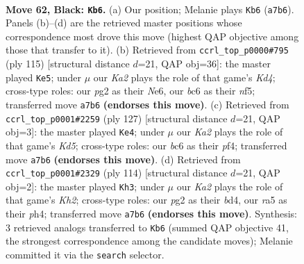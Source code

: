 \documentclass[11pt]{article}
\begin{document}
\clearpage

\begin{figure}[p]\centering
\begin{subfigure}{0.46\textwidth}\centering
\resizebox{\linewidth}{!}{%
\newchessgame
\chessboard[
  setfen={8/k7/2B1r3/R7/1P3p2/6N1/6P1/1K6 b - - 1 62},
  showmover=false,
  pgfstyle=straightmove, color=movearrow, markmove={a7-b6}
]}
\caption{}
\end{subfigure}\hfill
\begin{subfigure}{0.46\textwidth}\centering
\resizebox{\linewidth}{!}{%
\newchessgame
\chessboard[
  setfen={8/5r2/K3n3/3k1NPp/8/7P/8/3R4 b - - 2 58},
  showmover=false,
  pgfstyle=straightmove, color=movearrow, markmove={d5-e5}
]}
\caption{}
\end{subfigure}
\\[4pt]
\begin{subfigure}{0.46\textwidth}\centering
\resizebox{\linewidth}{!}{%
\newchessgame
\chessboard[
  setfen={8/8/6p1/8/1K1k1P1r/6R1/5P2/8 b - - 3 64},
  showmover=false,
  pgfstyle=straightmove, color=movearrow, markmove={d4-e4}
]}
\caption{}
\end{subfigure}\hfill
\begin{subfigure}{0.46\textwidth}\centering
\resizebox{\linewidth}{!}{%
\newchessgame
\chessboard[
  setfen={8/8/1n1R4/1P2p1k1/3b3p/8/2B4K/8 w - - 8 58},
  showmover=false,
  pgfstyle=straightmove, color=movearrow, markmove={h2-h3}
]}
\caption{}
\end{subfigure}
\caption{\textbf{Move 62, Black: \texttt{Kb6}.} (a) Our position; Melanie plays \texttt{Kb6} (\texttt{a7b6}). Panels (b)--(d) are the retrieved master positions whose correspondence most drove this move (highest QAP objective among those that transfer to it). (b) Retrieved from \texttt{ccrl\_top\_p0000\#795} (ply 115) [structural distance $d$=21, QAP obj=36]: the master played \texttt{Ke5}; under $\mu$ our \emph{Ka2} plays the role of that game's \emph{Kd4}; cross-type roles: our \emph{p}g2 as their \emph{N}e6, our \emph{b}c6 as their \emph{n}f5; transferred move \texttt{a7b6} \textbf{(endorses this move)}. (c) Retrieved from \texttt{ccrl\_top\_p0001\#2259} (ply 127) [structural distance $d$=21, QAP obj=3]: the master played \texttt{Ke4}; under $\mu$ our \emph{Ka2} plays the role of that game's \emph{Kd5}; cross-type roles: our \emph{b}c6 as their \emph{p}f4; transferred move \texttt{a7b6} \textbf{(endorses this move)}. (d) Retrieved from \texttt{ccrl\_top\_p0001\#2329} (ply 114) [structural distance $d$=21, QAP obj=2]: the master played \texttt{Kh3}; under $\mu$ our \emph{Ka2} plays the role of that game's \emph{Kh2}; cross-type roles: our \emph{p}g2 as their \emph{b}d4, our \emph{r}a5 as their \emph{p}h4; transferred move \texttt{a7b6} \textbf{(endorses this move)}. Synthesis: 3 retrieved analogs transferred to \texttt{Kb6} (summed QAP objective 41, the strongest correspondence among the candidate moves); Melanie committed it via the \texttt{search} selector.}
\label{fig:thought-m123}
\end{figure}
\end{document}
